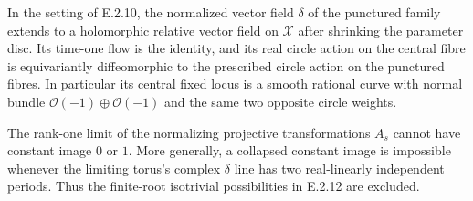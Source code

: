 \begin{proposition}
In the setting of E.2.10, the normalized vector field
$\delta$ of the punctured family extends to a holomorphic
relative vector field on $\mathcal X$ after shrinking
the parameter disc.  Its time-one flow is the identity,
and its real circle action on the central fibre is
equivariantly diffeomorphic to the prescribed circle
action on the punctured fibres.  In particular its
central fixed locus is a smooth rational curve with
normal bundle $\mathcal O(-1)\oplus\mathcal O(-1)$
and the same two opposite circle weights.

The rank-one limit of the normalizing projective
transformations $A_s$ cannot have constant image
$0$ or $1$.  More generally, a collapsed constant
image is impossible whenever the limiting torus's
complex $\delta$ line has two real-linearly
independent periods.  Thus the finite-root
isotrivial possibilities in E.2.12 are excluded.
\end{proposition}
